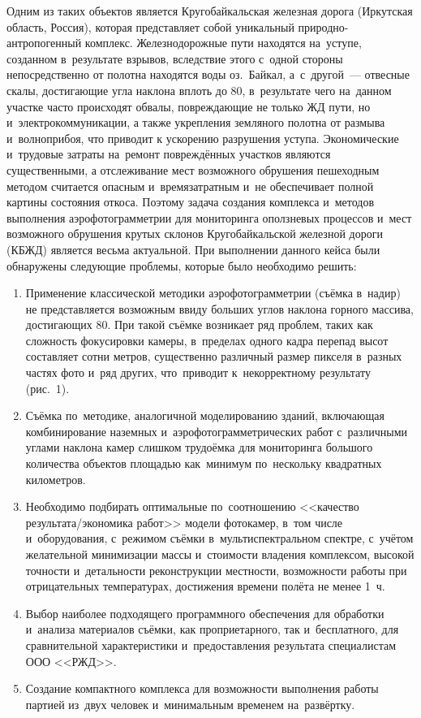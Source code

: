 Одним из таких объектов является Кругобайкальская железная дорога (Иркутская область, Россия), которая представляет собой уникальный природно-антропогенный комплекс. Железнодорожные пути находятся на~уступе, созданном в~результате взрывов, вследствие этого с~одной стороны непосредственно от полотна находятся воды оз.~Байкал, а~с~другой~--- отвесные скалы, достигающие угла наклона вплоть до 80\dg, в~результате чего на~данном участке часто происходят обвалы, повреждающие не только ЖД пути, но и~электрокоммуникации, а также укрепления земляного полотна от размыва и~волноприбоя, что приводит к ускорению разрушения уступа. Экономические и~трудовые затраты на~ремонт повреждённых участков являются существенными, а отслеживание мест возможного обрушения пешеходным методом считается опасным и~времязатратным и~не обеспечивает полной картины состояния откоса. Поэтому задача создания комплекса и~методов выполнения аэрофотограмметрии для мониторинга оползневых процессов и~мест возможного обрушения крутых склонов Кругобайкальской железной дороги (КБЖД) является весьма актуальной.
\clearpage
При выполнении данного кейса были обнаружены следующие проблемы, которые было необходимо решить:
\begin{enumerate}[noitemsep]\vspace{-8pt}
\item Применение классической методики аэрофотограмметрии (съёмка в~надир) не представляется возможным ввиду больших углов наклона горного массива, достигающих 80\dg. При такой съёмке возникает ряд проблем, таких как сложность фокусировки камеры, в~пределах одного кадра перепад высот составляет сотни метров, существенно различный размер пикселя в~разных частях фото и~ряд других, что~приводит к~некорректному результату (рис.~1).



\item Съёмка по~методике, аналогичной моделированию зданий, включающая комбинирование наземных и~аэрофотограмметрических работ с~различными углами наклона камер слишком трудоёмка для мониторинга большого количества объектов площадью как~минимум по~нескольку квадратных километров.
\item Необходимо подбирать оптимальные по~соотношению <<качество результата/экономика работ>> модели фотокамер, в~том числе и~оборудования, с~режимом съёмки в~мульти\-спектральном спектре, с~учётом желательной минимизации массы и~стоимости владения комплексом, высокой точности и~детальности реконструкции местности, возможности работы при отрицательных температурах, достижения времени полёта не менее 1~ч.
\item Выбор наиболее подходящего программного обеспечения для обработки и~анализа материалов съёмки, как проприетарного, так и~бесплатного, для сравнительной характеристики и~предоставления результата специалистам ООО <<РЖД>>.
\item Создание компактного комплекса для возможности выполнения работы партией из~двух человек и~минимальным временем на~развёртку.

\end{enumerate}
\vspace{-8pt}

